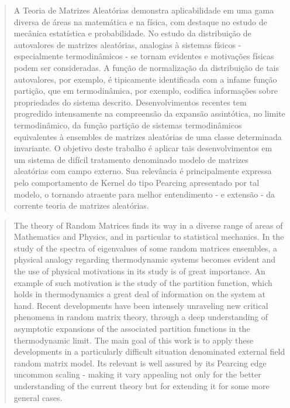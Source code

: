 \documentclass[a4paper,12pt]{article}
\numberwithin{equation}{section} %
\begin{document}
\clearpage
{}
\setlength{\parskip}{0mm}


\onehalfspacing
    
\begin{abstract}
	A Teoria de Matrizes Aleatórias demonstra aplicabilidade em uma gama diversa de áreas na matemática e na física, com destaque no estudo de mecânica estatística e probabilidade. No estudo da distribuição de autovalores de matrizes aleatórias, analogias à sistemas físicos - especialmente termodinâmicos - se tornam evidentes e motivações físicas podem ser consideradas. A função de normalização da distribuição de tais autovalores, por exemplo, é tipicamente identificada com a infame função partição, que em termodinâmica, por exemplo, codifica informações sobre propriedades do sistema descrito. Desenvolvimentos recentes tem progredido intensamente na compreensão da expansão assintótica, no limite termodinâmico, da função partição de sistemas termodinâmicos equivalentes à ensembles de matrizes aleatórias de uma classe determinada invariante. O objetivo deste trabalho é aplicar tais desenvolvimentos em um sistema de difícil tratamento denominado modelo de matrizes aleatórias com campo externo. Sua relevância é principalmente expressa pelo comportamento de Kernel do tipo Pearcing apresentado por tal modelo, o tornando atraente para melhor entendimento - e extensão - da corrente teoria de matrizes aleatórias.  
\end{abstract}


\begin{abstract}
	The theory of Random Matrices finds its way in a diverse range of areas of Mathematics and Physics, and in particular to statistical mechanics. In the study of the spectra of eigenvalues of some random matrices ensembles, a physical analogy regarding thermodynamic systems becomes evident and the use of physical motivations in its study is of great importance. An example of such motivation is the study of the partition function, which holds in thermodynamics a great deal of information on the system at hand. Recent developments have been intensely unraveling new critical phenomena in random matrix theory, through a deep understanding of asymptotic expansions of the associated partition functions in the thermodynamic limit. The main goal of this work is to apply these  developments in a particularly difficult situation denominated external field random matrix model. Its relevant is well assured by its Pearcing edge uncommon scaling - making it vary appealing not only for the better understanding of the current theory but for extending it for some more general cases.
\end{abstract}
\end{document}
